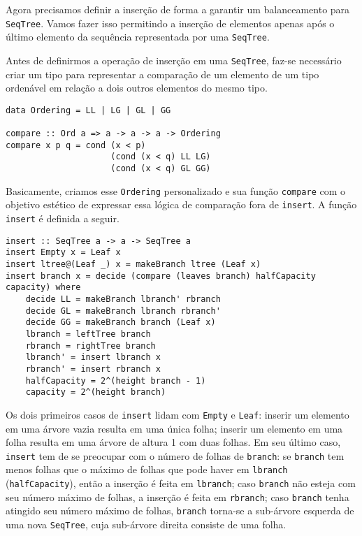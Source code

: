 \documentclass[a4paper]{article}
\begin{document}
Agora precisamos definir a inserção de forma a garantir um balanceamento para \texttt{SeqTree}.
Vamos fazer isso permitindo a inserção de elementos apenas após o último elemento da sequência representada por uma \texttt{SeqTree}. 

Antes de definirmos a operação de inserção em uma \texttt{SeqTree}, faz-se necessário criar um tipo para representar a comparação de um elemento de um tipo ordenável em relação a dois outros elementos do mesmo tipo.

\begin{verbatim}
data Ordering = LL | LG | GL | GG

compare :: Ord a => a -> a -> a -> Ordering
compare x p q = cond (x < p)
                     (cond (x < q) LL LG)
                     (cond (x < q) GL GG)
\end{verbatim}

Basicamente, criamos esse \texttt{Ordering} personalizado e sua função \texttt{compare} com o objetivo estético de expressar essa lógica de comparação fora de \texttt{insert}.
A função \texttt{insert} é definida a seguir.

\begin{verbatim}
insert :: SeqTree a -> a -> SeqTree a
insert Empty x = Leaf x
insert ltree@(Leaf _) x = makeBranch ltree (Leaf x)
insert branch x = decide (compare (leaves branch) halfCapacity capacity) where
	decide LL = makeBranch lbranch' rbranch
	decide GL = makeBranch lbranch rbranch'
	decide GG = makeBranch branch (Leaf x)
	lbranch = leftTree branch
	rbranch = rightTree branch
	lbranch' = insert lbranch x
	rbranch' = insert rbranch x
	halfCapacity = 2^(height branch - 1)
	capacity = 2^(height branch)
\end{verbatim}

Os dois primeiros casos de \texttt{insert} lidam com \texttt{Empty} e \texttt{Leaf}: inserir um elemento em uma árvore vazia resulta em uma única folha; inserir um elemento em uma folha resulta em uma árvore de altura 1 com duas folhas.
Em seu último caso, \texttt{insert} tem de se preocupar com o número de folhas de \texttt{branch}:
se \texttt{branch} tem menos folhas que o máximo de folhas que pode haver em \texttt{lbranch} (\texttt{halfCapacity}), então a inserção é feita em \texttt{lbranch};
caso \texttt{branch} não esteja com seu número máximo de folhas, a inserção é feita em \texttt{rbranch};
caso \texttt{branch} tenha atingido seu número máximo de folhas, \texttt{branch} torna-se a sub-árvore esquerda de uma nova \texttt{SeqTree}, cuja sub-árvore direita consiste de uma folha.
\end{document}
